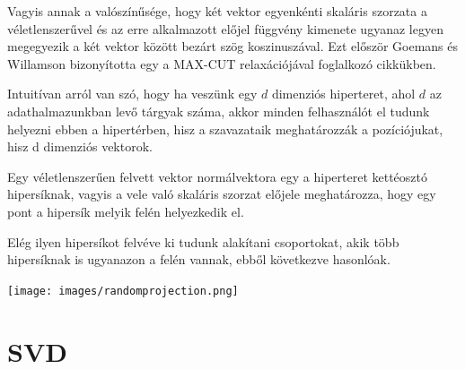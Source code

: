 \documentclass[final, 12pt] {ubb_dolgozat}{book}
\begin{document}
Vagyis annak a valószínűsége, hogy két vektor egyenkénti skaláris szorzata a véletlenszerűvel és az erre alkalmazott előjel függvény kimenete ugyanaz legyen megegyezik a két vektor között
bezárt szög koszinuszával.
Ezt először Goemans és Willamson bizonyította \citep{goemansImprovedApproximationAlgorithms1995} egy a MAX-CUT relaxációjával foglalkozó cikkükben.

Intuitívan arról van szó, hogy ha veszünk egy \(d\) dimenziós hiperteret, ahol \(d\) az adathalmazunkban levő tárgyak száma, akkor minden felhasználót el tudunk helyezni ebben a
hipertérben, hisz a szavazataik meghatározzák a pozíciójukat, hisz d dimenziós vektorok.

Egy véletlenszerűen felvett vektor normálvektora egy a hiperteret kettéosztó hipersíknak, vagyis
a vele való skaláris szorzat előjele meghatározza, hogy egy pont a hipersík melyik felén helyezkedik el.

Elég ilyen hipersíkot felvéve ki tudunk alakítani csoportokat, akik több hipersíknak is ugyanazon
a felén vannak, ebből következve hasonlóak.


\begin{center}
\texttt{[image: images/randomprojection.png]}
\end{center}
\citep{RandomProjectionLocality}


\section{SVD}
\label{sec:orgb837e16}
\citep{brandFastOnlineSVD2003}



\end{document}
